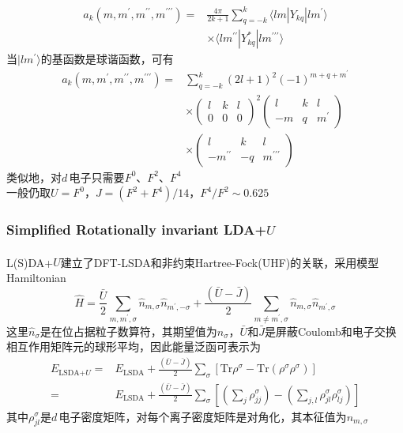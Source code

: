 \documentclass[cjk,slidestop,compress,mathserif,blue]{beamer}
\newcommand{\upcite}[1]{\hspace{0ex}\textsuperscript{\cite{#1}}} %
\begin{document}
\frame
{
	\begin{displaymath}
		\begin{aligned}
			a_k(m,m^{\prime},m^{\prime\prime},m^{\prime\prime\prime})=&\frac{4\pi}{2k+1}\sum_{q=-k}^k\langle lm|Y_{kq}|lm^{\prime}\rangle\\
			&\times\langle lm^{\prime\prime}|Y_{kq}^{\ast}|lm^{\prime\prime\prime}\rangle
		\end{aligned}
	\end{displaymath}
	当$|lm^{\prime}\rangle$的基函数是球谐函数，可有
	\begin{displaymath}
		\begin{aligned}
			a_k(m,m^{\prime},m^{\prime\prime},m^{\prime\prime\prime})=&\sum_{q=-k}^k(2l+1)^2(-1)^{m+q+m^{\prime}}\\
			&\times\left(
			\begin{matrix}
				l &k &l\\
				0 &0 &0
			\end{matrix}
			\right)^2\left(
			\begin{matrix}
				l &k &l\\
				-m &q &m^{\prime}
			\end{matrix}\right)\\
			&\times\left(
			\begin{matrix}
				l &k &l\\
				-m^{\prime\prime} &-q &m^{\prime\prime\prime}
			\end{matrix}\right)
		\end{aligned}
	\end{displaymath}
类似地，对$d$\,电子只需要$F^0$、$F^2$、$F^4$\\一般仍取$U=F^0$，$J=(F^2+F^4)/14$，$F^4/F^2\sim 0.625$
}

\frame
{
	\frametitle{\textrm{Simplified Rotationally invariant LDA+}$U$}
	\textrm{L(S)DA}+$U$建立了\textrm{DFT-LSDA}和非约束\textrm{Hartree-Fock(UHF)}的关联\upcite{PRB57-1505_1998}，采用模型\textrm{Hamiltonian}
\begin{displaymath}
	\hat H=\frac{\bar U}2\sum_{m,m^{\prime},\sigma}\hat n_{m,\sigma}\hat n_{m^{\prime},-\sigma}+\frac{(\bar U-\bar J)}2\sum_{m\neq m^{\prime},\sigma}\hat n_{m,\sigma}\hat n_{m^{\prime},\sigma}
\end{displaymath}
这里$\hat n_{\sigma}$是在位占据粒子数算符，其期望值为$n_{\sigma}$，$\bar U$和$\bar J$是屏蔽\textrm{Coulomb}和电子交换相互作用矩阵元的球形平均，因此能量泛函可表示为
	\begin{displaymath}
		\begin{aligned}
			E_{\textrm{LSDA+}U}=&E_{\textrm{LSDA}}+\frac{(\bar U-\bar J)}2\sum_{\sigma}\left[\mathrm{Tr}\rho^{\sigma}-\mathrm{Tr}(\rho^{\sigma}\rho^{\sigma})\right]\\
			=&E_{\textrm{LSDA}}+\frac{(\bar U-\bar J)}2\sum_{\sigma}\left[\left(\sum_j\rho_{jj}^{\sigma}\right)-\left(\sum_{j,l}\rho_{jl}^{\sigma}\rho_{lj}^{\sigma}\right)\right]
		\end{aligned}
	\end{displaymath}
	其中$\rho_{jl}^{\sigma}$是$d$\,电子密度矩阵，对每个离子密度矩阵是对角化，其本征值为$n_{m,\sigma}$
}
\end{document}
